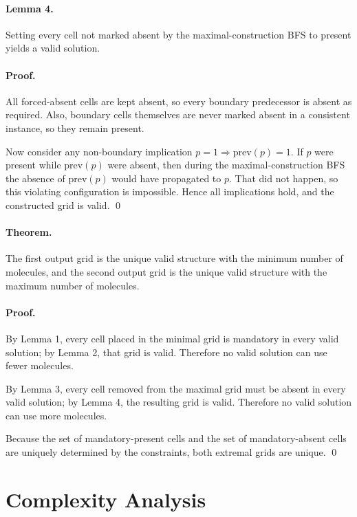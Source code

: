 \documentclass[11pt]{article}
\begin{document}
\paragraph{Lemma 4.}
Setting every cell not marked absent by the maximal-construction BFS to present yields a valid solution.

\paragraph{Proof.}
All forced-absent cells are kept absent, so every boundary predecessor is absent as required.
Also, boundary cells themselves are never marked absent in a consistent instance, so they remain present.

Now consider any non-boundary implication $p = 1 \Rightarrow \mathrm{prev}(p) = 1$. If $p$ were present
while $\mathrm{prev}(p)$ were absent, then during the maximal-construction BFS the absence of
$\mathrm{prev}(p)$ would have propagated to $p$. That did not happen, so this violating configuration is
impossible. Hence all implications hold, and the constructed grid is valid. \qed

\paragraph{Theorem.}
The first output grid is the unique valid structure with the minimum number of molecules, and the second
output grid is the unique valid structure with the maximum number of molecules.

\paragraph{Proof.}
By Lemma 1, every cell placed in the minimal grid is mandatory in every valid solution; by Lemma 2, that
grid is valid. Therefore no valid solution can use fewer molecules.

By Lemma 3, every cell removed from the maximal grid must be absent in every valid solution; by
Lemma 4, the resulting grid is valid. Therefore no valid solution can use more molecules.

Because the set of mandatory-present cells and the set of mandatory-absent cells are uniquely determined
by the constraints, both extremal grids are unique. \qed

\section*{Complexity Analysis}
\end{document}
